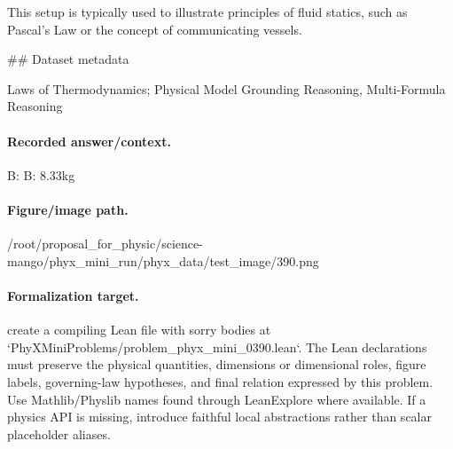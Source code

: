 This setup is typically used to illustrate principles of fluid statics, such as Pascal's Law or the concept of communicating vessels.

\#\# Dataset metadata

Laws of Thermodynamics; Physical Model Grounding Reasoning, Multi-Formula Reasoning

\paragraph{Recorded answer/context.}
B: B: 8.33kg

\paragraph{Figure/image path.}
/root/proposal\_for\_physic/science-mango/phyx\_mini\_run/phyx\_data/test\_image/390.png

\paragraph{Formalization target.}
create a compiling Lean file with sorry bodies at `PhyXMiniProblems/problem\_phyx\_mini\_0390.lean`. The Lean declarations must preserve the physical quantities, dimensions or dimensional roles, figure labels, governing-law hypotheses, and final relation expressed by this problem.
Use Mathlib/Physlib names found through LeanExplore where available. If a physics API is missing, introduce faithful local abstractions rather than scalar placeholder aliases.

